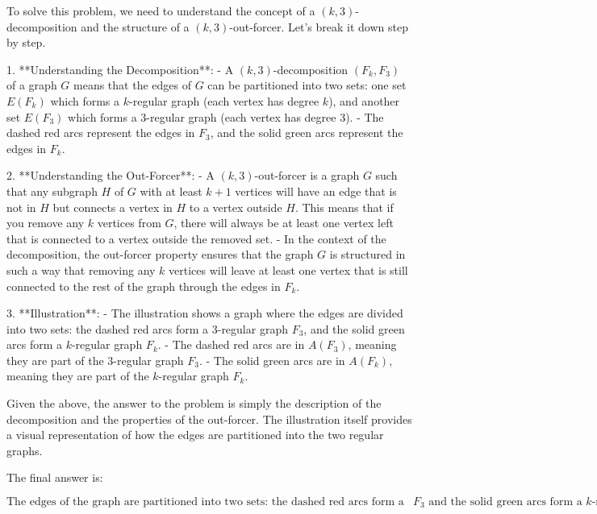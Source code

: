 To solve this problem, we need to understand the concept of a \((k,3)\)-decomposition and the structure of a \((k,3)\)-out-forcer. Let's break it down step by step.

1. **Understanding the Decomposition**:
   - A \((k,3)\)-decomposition \((F_k, F_3)\) of a graph \(G\) means that the edges of \(G\) can be partitioned into two sets: one set \(E(F_k)\) which forms a \(k\)-regular graph (each vertex has degree \(k\)), and another set \(E(F_3)\) which forms a 3-regular graph (each vertex has degree 3).
   - The dashed red arcs represent the edges in \(F_3\), and the solid green arcs represent the edges in \(F_k\).

2. **Understanding the Out-Forcer**:
   - A \((k,3)\)-out-forcer is a graph \(G\) such that any subgraph \(H\) of \(G\) with at least \(k+1\) vertices will have an edge that is not in \(H\) but connects a vertex in \(H\) to a vertex outside \(H\). This means that if you remove any \(k\) vertices from \(G\), there will always be at least one vertex left that is connected to a vertex outside the removed set.
   - In the context of the decomposition, the out-forcer property ensures that the graph \(G\) is structured in such a way that removing any \(k\) vertices will leave at least one vertex that is still connected to the rest of the graph through the edges in \(F_k\).

3. **Illustration**:
   - The illustration shows a graph where the edges are divided into two sets: the dashed red arcs form a 3-regular graph \(F_3\), and the solid green arcs form a \(k\)-regular graph \(F_k\).
   - The dashed red arcs are in \(A(F_3)\), meaning they are part of the 3-regular graph \(F_3\).
   - The solid green arcs are in \(A(F_k)\), meaning they are part of the \(k\)-regular graph \(F_k\).

Given the above, the answer to the problem is simply the description of the decomposition and the properties of the out-forcer. The illustration itself provides a visual representation of how the edges are partitioned into the two regular graphs.

The final answer is:

\[
\boxed{\text{The edges of the graph are partitioned into two sets: the dashed red arcs form a 3-regular graph } F_3 \text{ and the solid green arcs form a } k\text{-regular graph } F_k.}
\]